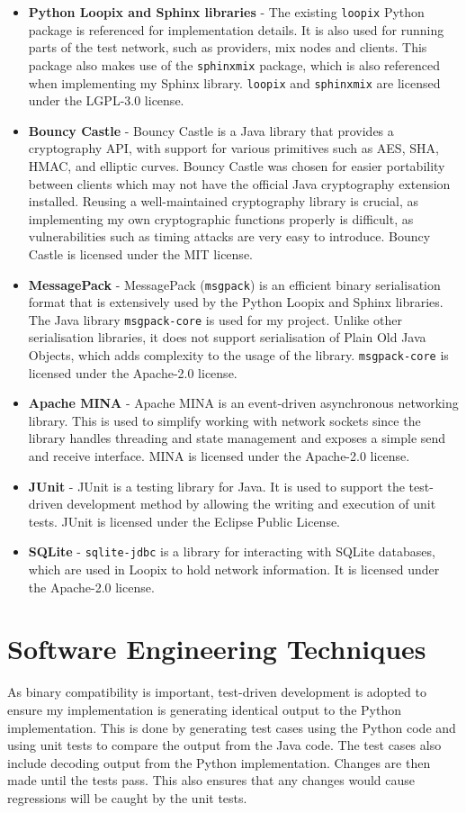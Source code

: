 \documentclass[final,dissertation.tex]{subfiles}
\begin{document}
\begin{itemize}
	\item \textbf{Python Loopix and Sphinx libraries} - The existing \verb|loopix| Python package is referenced for implementation details. It is also used for running parts of the test network, such as providers, mix nodes and clients. This package also makes use of the \verb|sphinxmix| package, which is also referenced when implementing my Sphinx library. \verb|loopix| and \verb|sphinxmix| are licensed under the LGPL-3.0 license.
	\item \textbf{Bouncy Castle} - Bouncy Castle is a Java library that provides a cryptography API, with support for various primitives such as AES, SHA, HMAC, and elliptic curves. Bouncy Castle was chosen for easier portability between clients which may not have the official Java cryptography extension installed. Reusing a well-maintained cryptography library is crucial, as implementing my own cryptographic functions properly is difficult, as vulnerabilities such as timing attacks are very easy to introduce. Bouncy Castle is licensed under the MIT license.
	\item \textbf{MessagePack} - MessagePack (\verb|msgpack|) is an efficient binary serialisation format that is extensively used by the Python Loopix and Sphinx libraries. The Java library \verb|msgpack-core| is used for my project. Unlike other serialisation libraries, it does not support serialisation of Plain Old Java Objects, which adds complexity to the usage of the library. \verb|msgpack-core| is licensed under the Apache-2.0 license.
	\item \textbf{Apache MINA} - Apache MINA is an event-driven asynchronous networking library. This is used to simplify working with network sockets since the library handles threading and state management and exposes a simple send and receive interface. MINA is licensed under the Apache-2.0 license.
	\item \textbf{JUnit} - JUnit is a testing library for Java. It is used to support the test-driven development method by allowing the writing and execution of unit tests. JUnit is licensed under the Eclipse Public License.
	\item \textbf{SQLite} - \verb|sqlite-jdbc| is a library for interacting with SQLite databases, which are used in Loopix to hold network information. It is licensed under the Apache-2.0 license.
\end{itemize}

\section{Software Engineering Techniques}

As binary compatibility is important, test-driven development is adopted to ensure my implementation is generating identical output to the Python implementation. This is done by generating test cases using the Python code and using unit tests to compare the output from the Java code. The test cases also include decoding output from the Python implementation. Changes are then made until the tests pass. This also ensures that any changes would cause regressions will be caught by the unit tests.
\end{document}
